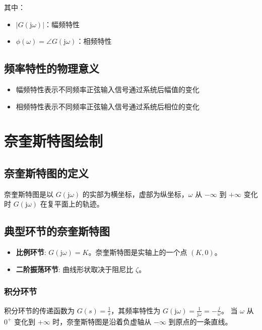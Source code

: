 \documentclass[12pt,a4paper]{article}
\newcommand{\jw}{\mathrm{j}\omega}
\begin{document}
其中：
\begin{itemize}
    \item $|G(\jw)|$：幅频特性
    \item $\phi(\omega) = \angle G(\jw)$：相频特性
\end{itemize}

\subsection{频率特性的物理意义}
\begin{itemize}
    \item 幅频特性表示不同频率正弦输入信号通过系统后幅值的变化
    \item 相频特性表示不同频率正弦输入信号通过系统后相位的变化
\end{itemize}

\section{奈奎斯特图绘制}

\subsection{奈奎斯特图的定义}
奈奎斯特图是以 $G(\jw)$ 的实部为横坐标，虚部为纵坐标，$\omega$ 从 $-\infty$ 到 $+\infty$ 变化时 $G(\jw)$ 在复平面上的轨迹。

\subsection{典型环节的奈奎斯特图}
\begin{itemize}
    \item \textbf{比例环节}: $G(\jw) = K$。奈奎斯特图是实轴上的一个点 $(K, 0)$。
    \item \textbf{二阶振荡环节}: 曲线形状取决于阻尼比 $\zeta$。
\end{itemize}

\subsubsection{积分环节}
积分环节的传递函数为 $G(s) = \frac{1}{s}$，其频率特性为 $G(\jw) = \frac{1}{\jw} = -\frac{j}{\omega}$。
当 $\omega$ 从 $0^+$ 变化到 $+\infty$ 时，奈奎斯特图是沿着负虚轴从 $-\infty$ 到原点的一条直线。

\begin{center}
\end{center}
\end{document}
